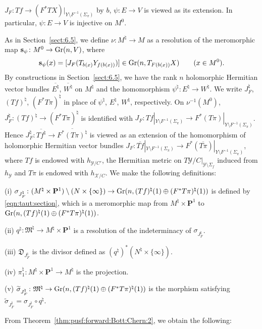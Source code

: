 \documentclass[amscd, leqno]{amsart}
\theoremstyle{plain}
\theoremstyle{definition}
\theoremstyle{remark}
\begin{document}
$J_{F} \colon Tf \to (F^{*}TX)|_{Y\setminus F^{-1}(\Sigma_{\pi})}$ by $b$, 
$\psi \colon E \to V$ is viewed as its extension. In particular, $\psi \colon E \to V$ is injective on $M^{0}$.
\par
As in Section~\ref{sect:6.5}, we define $\nu \colon M^{\natural} \to M$ as a resolution of the meromorphic map 
${\mathbf s}_{\psi} \colon M^{0} \to {\rm Gr}(n, V)$, where 
$$
{\mathbf s}_{\psi} (x) = [ J_{F}(T_{b(x)}Y_{f(b(x))}) ] \in {\rm Gr}(n, T_{F(b(x))}X)
\qquad ( x \in M^{0} ).
$$
By constructions in Section~\ref{sect:6.5}, we have the rank $n$ holomorphic Hermitian vector bundles 
$\overline{E^{\natural}}$, $\overline{W^{\natural}}$ on $M^{\natural}$ and the homomorphism 
$\psi^{\natural} \colon E^{\natural} \to W^{\natural}$. We write $J_{F}^{\natural}$, $(Tf)^{\natural}$, $(F^{*}T\pi)^{\natural}$ in place of 
$\psi^{\natural}$, $E^{\natural}$, $W^{\natural}$, respectively. 
On $\nu^{-1}(M^{0})$, $J_{F}^{\natural} \colon (Tf)^{\natural} \to (F^{*}T\pi)^{\natural}$ is identified with
$J_{F} \colon Tf|_{Y \setminus F^{-1}(\Sigma_{\pi})} \to F^{*}(T\pi)|_{Y \setminus F^{-1}(\Sigma_{\pi})}$. 
Hence $J_{F}^{\natural} \colon\overline{Tf^{\natural}} \to \overline{F^{*}(T\pi)^{\natural}}$ is viewed as an extension of 
the homomorphism of holomorphic Hermitian vector bundles
$J_{F} \colon \overline{Tf}|_{Y \setminus F^{-1}(\Sigma_{\pi})} \to F^{*}(\overline{T\pi})|_{Y \setminus F^{-1}(\Sigma_{\pi})}$, 
where $Tf$ is endowed with $h_{{\mathcal Y}/C'}$, 
the Hermitian metric on $T{\mathcal Y}/C|_{{\mathcal Y}\setminus\Sigma_{f}}$ induced from $h_{\mathcal Y}$ 
and $T\pi$ is endowed with $h_{{\mathcal X}/C}$. We make the following definitions:
\par{(i) }
${\sigma}_{J_{F}^{\natural}} \colon 
(M^{\natural} \times {\mathbf P}^{1}) \setminus ( N \times \{ \infty \} ) \to {\rm Gr}(n, (Tf)^{\natural}(1) \oplus (F^{*}T\pi)^{\natural}(1) )$ 
is defined by \eqref{eqn:taut:section}, which is a meromorphic map from 
$M^{\natural}\times{\mathbf P}^{1}$ to ${\rm Gr}(n, (Tf)^{\natural}(1)\oplus (F^{*}T\pi)^{\natural}(1))$.
\par{(ii) }
$q^{\natural} \colon {\mathfrak M}^{\natural} \to M^{\natural} \times{\mathbf P}^{1}$ is a resolution of the indeterminacy of 
$\sigma_{J_{F}^{\natural}}$.
\par{(iii) }
${\mathfrak D}_{J_{F}^{\natural}}$ is the divisor defined as $(q^{\natural})^{*}(N^{\natural} \times \{ \infty \})$.
\par{(iv) }
$\pi_{1}^{\natural} \colon M^{\natural} \times {\mathbf P}^{1} \to M^{\natural}$ is the projection.
\par{(v) }
$\widetilde{\sigma}_{J_{F}^{\natural}} \colon {\mathfrak M}^{\natural} \to {\rm Gr}(n, (Tf)^{\natural}(1) \oplus (F^{*}T\pi)^{\natural}(1))$
is the morphism satisfying $\widetilde{\sigma}_{J_{F}^{\natural}} = {\sigma}_{J_{F}^{\natural}} \circ q^{\natural}$.
\par
From Theorem~\ref{thm:pusf:forward:Bott:Chern:2}, we obtain the following:
\end{document}
